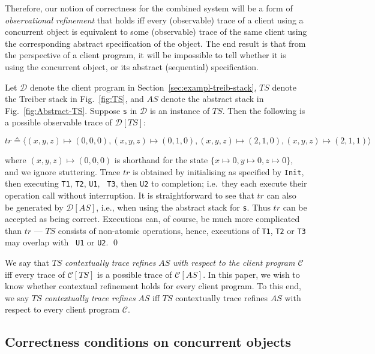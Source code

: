 \documentclass[11pt]{llncs}
\newcommand{\mcC}{\mathcal{C}}
\newcommand{\mcD}{\mathcal{D}}
\newcommand{\reffig}[1]{Fig.~\ref{#1}}
\newcommand{\refsec}[1]{Section~\ref{#1}}
\begin{document}
Therefore, our notion of correctness for the combined system will be a
form of \emph{observational refinement} that holds iff every
(observable) trace of a client using a concurrent object is equivalent
to some (observable) trace of the same client using the corresponding
abstract specification of the object. The end result is that from the
perspective of a client program, it will be impossible to tell whether
it is using the concurrent object, or its abstract (sequential)
specification.
\begin{example}
  \label{ex:2}
  Let $\mcD$ denote the client program in \refsec{sec:exampl-treib-stack}, $TS$ denote the
  Treiber stack in \reffig{fig:TS}, and $AS$ denote the abstract stack
  in \reffig{fig:Abstract-TS}. Suppose {\tt s} in $\mcD$ is an instance
  of $TS$. Then the following is a possible observable trace of
  $\mcD[TS]$: \smallskip
  
  \noindent$tr \sdef  \langle (x, y, z) \mapsto (0, 0, 0), (x, y, z)
  \mapsto (0,1,0),(x, y, z) \mapsto (2,1, 0),  (x, y, z) \mapsto
  (2,1,1) \rangle
  $\smallskip 
  
  \noindent
  where $(x, y, z) \mapsto (0, 0, 0)$ is shorthand for the state $\{x
  \mapsto 0, y \mapsto 0, z\mapsto 0\}$, and we ignore stuttering.  
  Trace $tr$ is obtained by initialising as specified
  by {\tt Init}, then executing {\tt T1}, {\tt T2}, {\tt U1}, {\tt
    T3}, then {\tt U2} to completion; i.e.\ they each execute their
  operation call without interruption. It is straightforward to see
  that $tr$ can also be generated by $\mcD[AS]$, i.e., when using the
  abstract stack for {\tt s}. Thus $tr$ can be accepted as being
  correct. Executions can, of course, be much more complicated than
  $tr$ --- $TS$ consists of non-atomic operations, hence,
  executions of {\tt T1}, {\tt T2} or {\tt T3} may overlap with {\tt
    U1} or {\tt U2}.  \hfill\qed
\end{example}

We say that
$TS$ \emph{contextually trace refines} $AS$ \emph{with respect to the
  client program $\mcC$} iff every trace of $\mcC[TS]$ is a possible
trace of $\mcC[AS]$. In this paper, we wish to know whether contextual
refinement holds for every client program. To this end, we say $TS$
\emph{contextually trace refines} $AS$ iff $TS$ contextually trace
refines $AS$ with respect to every client program
$\mcC$.

\vspace{-1mm}


\subsection{Correctness conditions on concurrent objects}
\end{document}
